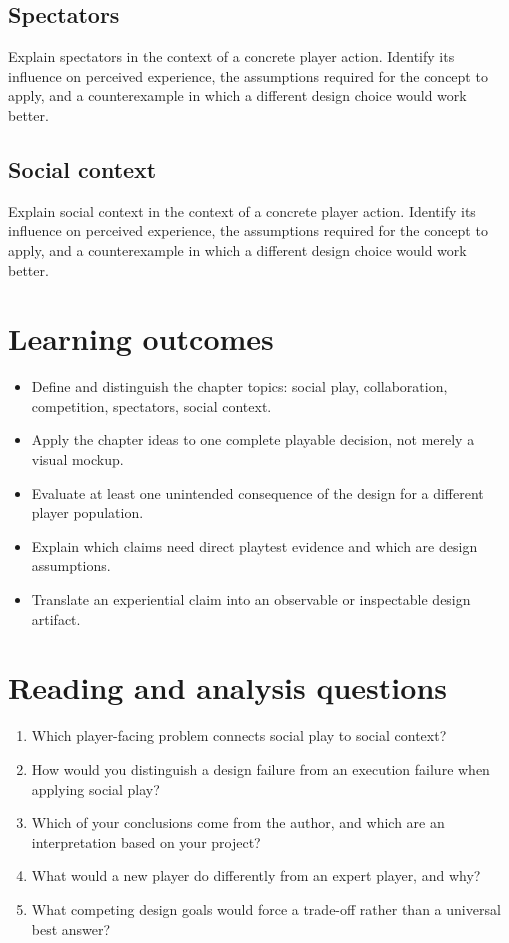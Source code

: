 \documentclass[11pt]{article}
\begin{document}
\subsection{Spectators}
Explain spectators in the context of a concrete player action. Identify its influence on perceived experience, the assumptions required for the concept to apply, and a counterexample in which a different design choice would work better.


\subsection{Social context}
Explain social context in the context of a concrete player action. Identify its influence on perceived experience, the assumptions required for the concept to apply, and a counterexample in which a different design choice would work better.


\section{Learning outcomes}
\begin{itemize}
\item Define and distinguish the chapter topics: social play, collaboration, competition, spectators, social context.
\item Apply the chapter ideas to one complete playable decision, not merely a visual mockup.
\item Evaluate at least one unintended consequence of the design for a different player population.
\item Explain which claims need direct playtest evidence and which are design assumptions.
\item Translate an experiential claim into an observable or inspectable design artifact.
\end{itemize}

\section{Reading and analysis questions}
\begin{enumerate}
\item Which player-facing problem connects social play to social context?
\item How would you distinguish a design failure from an execution failure when applying social play?
\item Which of your conclusions come from the author, and which are an interpretation based on your project?
\item What would a new player do differently from an expert player, and why?
\item What competing design goals would force a trade-off rather than a universal best answer?
\end{enumerate}
\end{document}
